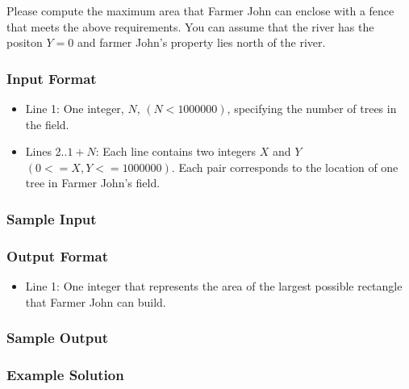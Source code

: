 Please compute the maximum area that Farmer John can enclose with a fence that meets the above requirements.
You can assume that the river has the positon $Y=0$ and farmer John's property lies north of the river.

\subsubsection{Input Format}
\begin{itemize}
  \item Line 1: One integer, $N$, $(N < 1000000)$, specifying the number of trees in the field.
  \item Lines 2..$1+N$: Each line contains two integers $X$ and $Y$ $(0 <= X,Y <= 1000000)$.
        Each pair corresponds to the location of one tree in Farmer John's field.
\end{itemize}

\subsubsection{Sample Input}


\subsubsection{Output Format}
\begin{itemize}
  \item Line 1: One integer that represents the area of the largest possible rectangle that Farmer John can build.
\end{itemize}

\subsubsection{Sample Output}


\subsubsection{Example Solution}

